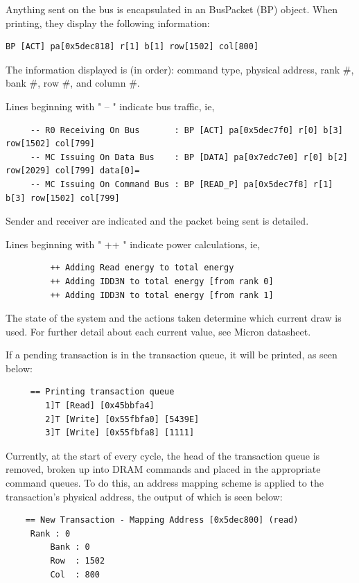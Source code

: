 \documentclass[11pt]{article}
\begin{document}
\begin{minipage}{\textwidth}
Anything sent on the bus is encapsulated in an BusPacket (BP) object. When
printing, they display the following information:
\begin{lstlisting}
BP [ACT] pa[0x5dec818] r[1] b[1] row[1502] col[800]
\end{lstlisting}
The information displayed  is (in order): command type, physical address, rank
\#, bank \#, row \#, and column \#.
\end{minipage}


\begin{minipage}{\textwidth}
Lines beginning with " -- " indicate bus traffic, ie, 
\begin{lstlisting}
     -- R0 Receiving On Bus       : BP [ACT] pa[0x5dec7f0] r[0] b[3] row[1502] col[799]
     -- MC Issuing On Data Bus    : BP [DATA] pa[0x7edc7e0] r[0] b[2] row[2029] col[799] data[0]=
     -- MC Issuing On Command Bus : BP [READ_P] pa[0x5dec7f8] r[1] b[3] row[1502] col[799]
\end{lstlisting}
Sender and receiver are indicated and the packet being sent is detailed.
\end{minipage}

Lines beginning with " ++ " indicate power calculations, ie, 
\begin{lstlisting}
		 ++ Adding Read energy to total energy
 		 ++ Adding IDD3N to total energy [from rank 0]
 		 ++ Adding IDD3N to total energy [from rank 1]
\end{lstlisting}
The state of the system and the actions taken determine which current draw is used. For further detail about each current value, see Micron datasheet.  


If a pending transaction is in the transaction queue, it will be printed, as seen below:
\begin{lstlisting}
	 == Printing transaction queue		
		1]T [Read] [0x45bbfa4]
		2]T [Write] [0x55fbfa0] [5439E]
		3]T [Write] [0x55fbfa8] [1111]
\end{lstlisting}
Currently, at the start of every cycle, the head of the transaction
queue is removed, broken up into DRAM commands and placed in the
appropriate command queues.  To do this, an address mapping scheme
is applied to the transaction's physical address, the output of 
which is seen below:
\begin{lstlisting}
	== New Transaction - Mapping Address [0x5dec800] (read)
	 Rank : 0
		 Bank : 0
		 Row  : 1502
		 Col  : 800
\end{lstlisting}
\end{document}
